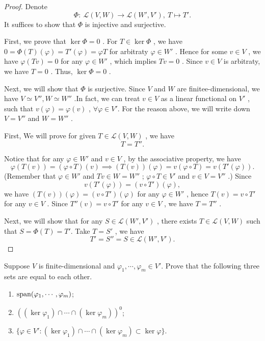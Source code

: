 \documentclass{article}
\begin{document}
\begin{proof}
	Denote
	\[ \Phi:\ \mathcal{L}(V,W)\to \mathcal{L}(W',V'),\ T\mapsto T'. \] 
	It suffices to show that \( \Phi \) is injective and surjective.\par
	First, we prove that \( \ker\Phi=0 \) . For \( T\in\ker\Phi \) , we have \( 0=\Phi(T)(\varphi)=T'(\varphi)=\varphi T \) for arbitraty \( \varphi\in W' \) . Hence for some \( v\in V \) , we have \( \varphi(Tv)=0 \) for any \( \varphi\in W' \) , which implies \( Tv=0 \) . Since \( v\in V \) is arbitraty, we have \( T=0 \) . Thus, \( \ker\Phi=0 \) .\par
	Next, we will show that \( \Phi \) is surjective. Since \( V \) and \( W \) are finitee-dimensional, we have \( V\simeq V'', W\simeq W'' \) .In fact, we can treat \( v\in V \) as a linear functional on \( V' \) , such that \( v(\varphi)=\varphi(v) \) , \( \forall\varphi\in V' \). For the reason above, we will write down \( V=V'' \) and \( W=W'' \) .\par
	First, We will prove for given \( T\in \mathcal{L}(V,W) \) , we have
	\[ T=T''. \] \par
	Notice that for any \( \varphi\in W' \) and \( v\in V \) , by the associative property, we have
	\[ \varphi(T(v))=(\varphi\circ T)(v)\implies (T(v))(\varphi)=v(\varphi\circ T)=v(T'(\varphi)). \] 
	(Remember that  \( \varphi\in W' \) and \( Tv\in W=W'' \) ; \( \varphi\circ T \in V' \) and \( v\in V=V'' \) .) Since
	\[ v(T'(\varphi))=(v\circ T')(\varphi), \] 
	we have \( (T(v))(\varphi)=(v\circ T')(\varphi) \) for any \( \varphi\in W' \) , hence \( T(v)=v\circ T' \) for any \( v\in V \) . Since \( T''(v)=v\circ T' \) for any \( v\in V \) , we have \( T=T'' \) .\par
	Next, we will show that for any \( S\in \mathcal{L}(W',V') \) , there exists \( T\in \mathcal{L}(V,W) \) such that \( S=\Phi(T)=T' \). Take \( T=S' \) , we have
	\[ T'=S''=S\in \mathcal{L}(W',V'). \] 
\end{proof}

\begin{problem}[3F-23]
	Suppose $V$ is finite-dimensional and $\varphi_1, \cdots, \varphi_m \in V'$. Prove that the following three sets are equal to each other.
	\begin{enumerate}[label=(\alph*)]
		\item $\operatorname{span}(\varphi_1, \cdots, \varphi_m)$;
		\item $\left((\ker \varphi_1) \cap \cdots \cap (\ker \varphi_m)\right)^0$;
		\item $\{\varphi \in V' : (\ker \varphi_1) \cap \cdots \cap (\ker \varphi_m) \subset \ker \varphi\}$.
	\end{enumerate}
\end{problem}
\end{document}
